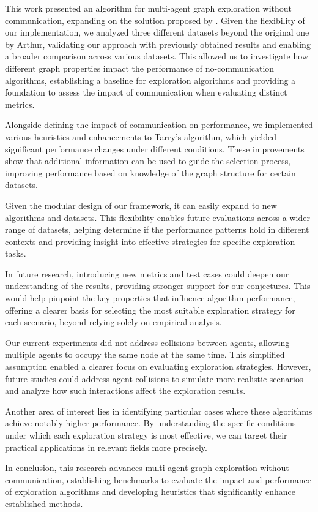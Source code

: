 This work presented an algorithm for multi-agent graph exploration without communication, expanding on the solution proposed by . Given the flexibility of our implementation, we analyzed three different datasets beyond the original one by Arthur, validating our approach with previously obtained results and enabling a broader comparison across various datasets. This allowed us to investigate how different graph properties impact the performance of no-communication algorithms, establishing a baseline for exploration algorithms and providing a foundation to assess the impact of communication when evaluating distinct metrics.

Alongside defining the impact of communication on performance, we implemented various heuristics and enhancements to Tarry's algorithm, which yielded significant performance changes under different conditions. These improvements show that additional information can be used to guide the selection process, improving performance based on knowledge of the graph structure for certain datasets.

Given the modular design of our framework, it can easily expand to new algorithms and datasets. This flexibility enables future evaluations across a wider range of datasets, helping determine if the performance patterns hold in different contexts and providing insight into effective strategies for specific exploration tasks.

In future research, introducing new metrics and test cases could deepen our understanding of the results, providing stronger support for our conjectures. This would help pinpoint the key properties that influence algorithm performance, offering a clearer basis for selecting the most suitable exploration strategy for each scenario, beyond relying solely on empirical analysis.

Our current experiments did not address collisions between agents, allowing multiple agents to occupy the same node at the same time. This simplified assumption enabled a clearer focus on evaluating exploration strategies. However, future studies could address agent collisions to simulate more realistic scenarios and analyze how such interactions affect the exploration results.

Another area of interest lies in identifying particular cases where these algorithms achieve notably higher performance. By understanding the specific conditions under which each exploration strategy is most effective, we can target their practical applications in relevant fields more precisely.

In conclusion, this research advances multi-agent graph exploration without communication, establishing benchmarks to evaluate the impact and performance of exploration algorithms and developing heuristics that significantly enhance established methods.